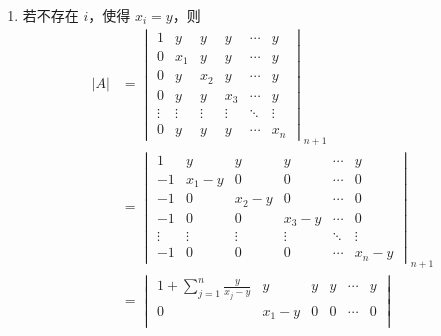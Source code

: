 \documentclass[UTF8,12pt,a4paper,fontset=fandol]{ctexart}
\begin{document}
\begin{solve}
\begin{enumerate}
\begin{enumerate}
                            \item 若不存在 $i$，使得 $x_i = y$，则
                                \begin{align*}
                                    |A| &= \begin{vmatrix}
                                        1      & y      & y      & y      & \cdots & y      \\
                                        0      & x_1    & y      & y      & \cdots & y      \\
                                        0      & y      & x_2    & y      & \cdots & y      \\
                                        0      & y      & y      & x_3    & \cdots & y      \\
                                        \vdots & \vdots & \vdots & \vdots & \ddots & \vdots \\
                                        0      & y      & y      & y      & \cdots & x_n
                                    \end{vmatrix}_{n+1} \\
                                    &= \begin{vmatrix}
                                        1      & y      & y      & y      & \cdots & y      \\
                                        -1     & x_1-y  & 0      & 0      & \cdots & 0      \\
                                        -1     & 0      & x_2-y  & 0      & \cdots & 0      \\
                                        -1     & 0      & 0      & x_3-y  & \cdots & 0      \\
                                        \vdots & \vdots & \vdots & \vdots & \ddots & \vdots \\
                                        -1     & 0      & 0      & 0      & \cdots & x_n-y
                                    \end{vmatrix}_{n+1} \\
                                    &= \begin{vmatrix}
                                        1 + \sum_{j=1}^n \frac{y}{x_j-y} & y      & y      & y      & \cdots & y      \\
                                        0                                & x_1-y  & 0      & 0      & \cdots & 0      \\

\end{vmatrix}
\end{align*}
\end{enumerate}
\end{enumerate}
\end{solve}
\end{document}
